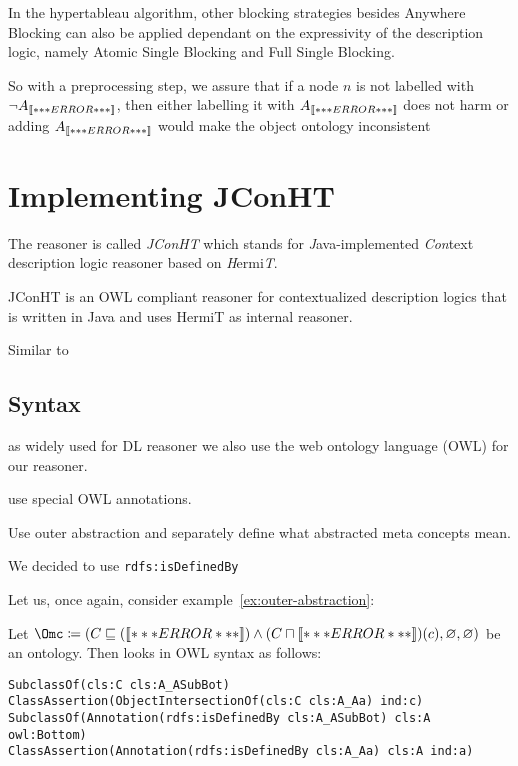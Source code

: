 In the hypertableau algorithm, other blocking strategies besides \textsf{Anywhere Blocking} can also
be applied dependant on the expressivity of the description logic, namely \textsf{Atomic Single
  Blocking} and \textsf{Full Single Blocking.}

\vspace{1cm}

So with a preprocessing step, we assure that if a node $n$ is not labelled with $\lnot
A_{\mathord{\left\llbracket***ERROR***\right\rrbracket}}$, then either labelling it with $A_{\mathord{\left\llbracket***ERROR***\right\rrbracket}}$ does not harm or adding
$A_{\mathord{\left\llbracket***ERROR***\right\rrbracket}}$ would make the object ontology inconsistent

\section{Implementing JConHT}
\label{sec:implementing-jconht}

The reasoner is called \emph{JConHT} which stands for \emph{J}ava-implemented \emph{Con}text
description logic reasoner based on \emph{H}ermi\emph{T}.

JConHT is an OWL compliant reasoner for contextualized description logics that is written in Java
and uses HermiT as internal reasoner.

Similar to

\clearpage

\subsection{Syntax}
\label{sec:syntax}


as widely used for DL reasoner we also use the web ontology language (OWL) for our reasoner. 

use special OWL annotations.

Use outer abstraction and separately define what abstracted meta concepts mean.


We decided to use \verb+rdfs:isDefinedBy+

Let us, once again, consider example~\ref{ex:outer-abstraction}:
\begin{example}\label{ex:outer-abstraction-as-OWL}
  Let
  $\Omc \coloneqq (C\sqsubseteq(\oax{A\sqsubseteq\bot}) \land (C\sqcap\oax{A(a)})(c), \emptyset,
  \emptyset)$ be an \ALCALC ontology. Then \Omc looks in OWL syntax as follows:

\begin{verbatim}
SubclassOf(cls:C cls:A_ASubBot)
ClassAssertion(ObjectIntersectionOf(cls:C cls:A_Aa) ind:c)
SubclassOf(Annotation(rdfs:isDefinedBy cls:A_ASubBot) cls:A owl:Bottom)
ClassAssertion(Annotation(rdfs:isDefinedBy cls:A_Aa) cls:A ind:a)
\end{verbatim}

\vspace{-2.0\baselineskip}  
\end{example}

